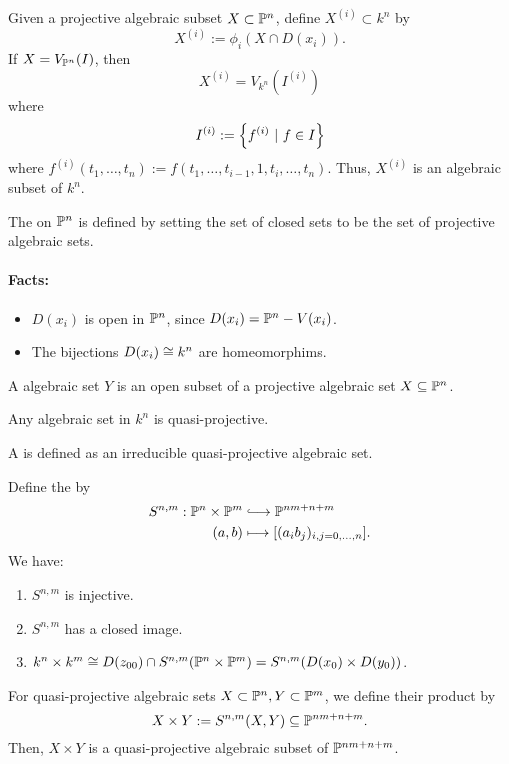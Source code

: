 Given a projective algebraic subset $X \subset \P^n$, define $X^{(i)} \subset k^n$ by
\[ X^{(i)} := \phi_i (X \cap D(x_i)) .\]
If $X = V_{\P^n}(I)$, then
\[ X^{(i)} = V_{k^n}(I^{(i)}) \]
where
\[ I^{(i)} := \set{f^{(i)}}{f \in I} \]
where $f^{(i)} (t_1,\ldots, t_n) := f(t_1,\ldots, t_{i-1}, 1, t_i, \ldots, t_n)$. Thus, $X^{(i)}$ is an algebraic subset of $k^n$.
\begin{definition}
The  on $\P^n$ is defined by setting the set of closed sets to be the set of projective algebraic sets.
\end{definition}
\paragraph{Facts:}
\begin{itemize}
	\item $D(x_i)$ is open in $\P^n$, since $D(x_i) = \P^n - V(x_i)$.
	\item The bijections $D(x_i) \isom{} k^n$ are homeomorphims.
\end{itemize}
\begin{definition}
	A  algebraic set $Y$ is an open subset of a projective algebraic set $X \subseteq \P^n$.
\end{definition}
\begin{example}
	Any algebraic set in $k^n$ is quasi-projective.
\end{example}
\begin{definition}
A  is defined as an irreducible quasi-projective algebraic set.
\end{definition}

\begin{lemma}[Products]
Define the  by
\begin{align*}
S^{n,m} : \P^n \times \P^m & \Inj{} \P^{nm+n+m}\\
(a,b) & \longmapsto [(a_ib_j)_{i,j=0,\ldots, n}].
\end{align*}
We have:
\begin{enumerate}
	\item  $S^{n,m}$ is injective.
	\item $S^{n,m}$ has a closed image.
	\item $k^n \times k^m \isom{} D(z_{00}) \cap S^{n,m}(\P^n \times \P^m) = S^{n,m}(D(x_0)\times D(y_0))$.
\end{enumerate}
\end{lemma}

\begin{definition}
	For quasi-projective algebraic sets $X \subset \P^n, Y \subset \P^m$, we define their product by
	\[ X\times Y := S^{n,m}(X,Y) \subseteq \P^{nm+n+m}. \]
	Then, $X\times Y$ is a quasi-projective algebraic subset of $\P^{nm+n+m}$.
\end{definition}
